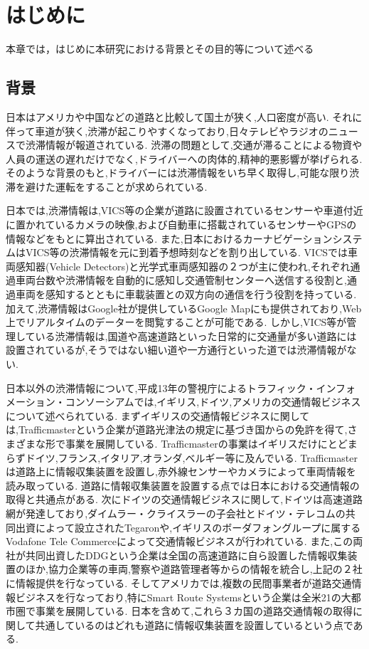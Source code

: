 \chapter{はじめに}
本章では，はじめに本研究における背景とその目的等について述べる
\newpage
\section{背景}
日本はアメリカや中国などの道路と比較して国土が狭く,人口密度が高い.
それに伴って車道が狭く,渋滞が起こりやすくなっており,日々テレビやラジオのニュースで渋滞情報が報道されている.
渋滞の問題として,交通が滞ることによる物資や人員の運送の遅れだけでなく,ドライバーへの肉体的,精神的悪影響が挙げられる.
そのような背景のもと,ドライバーには渋滞情報をいち早く取得し,可能な限り渋滞を避けた運転をすることが求められている.

日本では,渋滞情報は,VICS等の企業が道路に設置されているセンサーや車道付近に置かれているカメラの映像,および自動車に搭載されているセンサーやGPSの情報などをもとに算出されている.
また,日本におけるカーナビゲーションシステムはVICS等の渋滞情報を元に到着予想時刻などを割り出している.
VICSでは車両感知器(Vehicle Detectors)と光学式車両感知器の２つが主に使われ,それぞれ通過車両台数や渋滞情報を自動的に感知し交通管制センターへ送信する役割と,通過車両を感知するとともに車載装置との双方向の通信を行う役割を持っている.
加えて,渋滞情報はGoogle社が提供しているGoogle Mapにも提供されており,Web上でリアルタイムのデーターを閲覧することが可能である.
しかし,VICS等が管理している渋滞情報は,国道や高速道路といった日常的に交通量が多い道路には設置されているが,そうではない細い道や一方通行といった道では渋滞情報がない.

日本以外の渋滞情報について,平成13年の警視庁によるトラフィック・インフォメーション・コンソーシアムでは,イギリス,ドイツ,アメリカの交通情報ビジネスについて述べられている\cite{traffic_buisiness}.
まずイギリスの交通情報ビジネスに関しては,Trafficmasterという企業が道路光津法の規定に基づき国からの免許を得て,さまざまな形で事業を展開している.
Trafficmasterの事業はイギリスだけにとどまらずドイツ,フランス,イタリア,オランダ,ベルギー等に及んでいる.
Trafficmasterは道路上に情報収集装置を設置し,赤外線センサーやカメラによって車両情報を読み取っている.
道路に情報収集装置を設置する点では日本における交通情報の取得と共通点がある.
次にドイツの交通情報ビジネスに関して,ドイツは高速道路網が発達しており,ダイムラー・クライスラーの子会社とドイツ・テレコムの共同出資によって設立されたTegaronや,イギリスのボーダフォングループに属するVodafone Tele Commerceによって交通情報ビジネスが行われている.
また,この両社が共同出資したDDGという企業は全国の高速道路に自ら設置した情報収集装置のほか,協力企業等の車両,警察や道路管理者等からの情報を統合し,上記の２社に情報提供を行なっている.
そしてアメリカでは,複数の民間事業者が道路交通情報ビジネスを行なっており,特にSmart Route Systemsという企業は全米21の大都市圏で事業を展開している.
日本を含めて,これら３カ国の道路交通情報の取得に関して共通しているのはどれも道路に情報収集装置を設置しているという点である.

